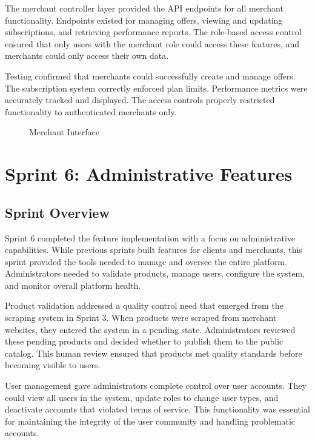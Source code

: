 The merchant controller layer provided the API endpoints for
all merchant functionality. Endpoints existed for managing
offers, viewing and updating subscriptions, and retrieving
performance reports. The role-based access control ensured
that only users with the merchant role could access these
features, and merchants could only access their own data.

Testing confirmed that merchants could successfully create and
manage offers. The subscription system correctly enforced plan
limits. Performance metrics were accurately tracked and displayed.
The access controls properly restricted functionality to
authenticated merchants only.

\begin{figure}[H]
\begin{center}
\end{center}
\caption{Merchant Interface}
\label{fig:merchant_interface}
\end{figure}

\section*{Sprint 6: Administrative Features}

\subsection*{Sprint Overview}

Sprint 6 completed the feature implementation with a focus on
administrative capabilities. While previous sprints built features
for clients and merchants, this sprint provided the tools needed
to manage and oversee the entire platform. Administrators needed
to validate products, manage users, configure the system, and
monitor overall platform health.

Product validation addressed a quality control need that emerged
from the scraping system in Sprint 3. When products were scraped
from merchant websites, they entered the system in a pending
state. Administrators reviewed these pending products and decided
whether to publish them to the public catalog. This human review
ensured that products met quality standards before becoming
visible to users.

User management gave administrators complete control over user
accounts. They could view all users in the system, update roles
to change user types, and deactivate accounts that violated
terms of service. This functionality was essential for maintaining
the integrity of the user community and handling problematic
accounts.

